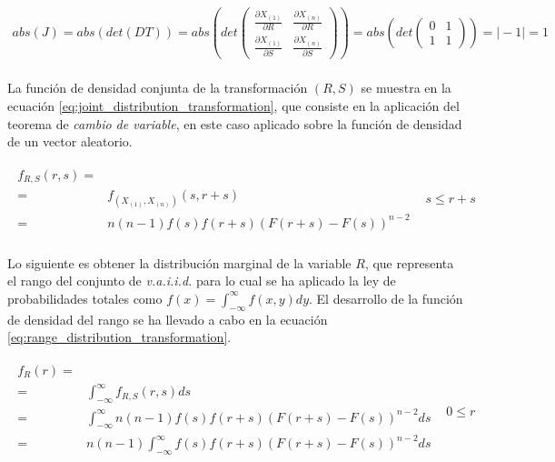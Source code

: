 \documentclass{article}
\begin{document}
    \begin{align}
    \label{eq:variable_transformation_jacobian}
      abs(J) =
      abs(det(DT)) =
      abs\left(det\left( \begin{array}{cc}
        \frac{\partial X_{(1)}}{ \partial R} & \frac{\partial X_{(n)}}{ \partial R}  \\
        \frac{\partial X_{(1)}}{ \partial S} & \frac{\partial X_{(n)}}{ \partial S}
      \end{array} \right) \right) =
      abs\left(det\left( \begin{array}{cc}
        0 & 1  \\
        1 & 1
      \end{array} \right) \right)  =
      \mid -1\mid =
      1
    \end{align}

    \paragraph{}
    La función de densidad conjunta de la transformación $(R,S)$ se muestra en la ecuación \eqref{eq:joint_distribution_transformation}, que consiste en la aplicación del teorema de \emph{cambio de variable}, en este caso aplicado sobre la función de densidad de un vector aleatorio.

    \begin{align}
    \label{eq:joint_distribution_transformation}
      \begin{split}
        f_{R,S}(r,s) =& \\
        =& f_{(X_{(1)}, X_{(n)})} (s,r+s) \\
        =& n(n-1)f(s)f(r+s)(F(r+s) - F(s))^{n-2}
      \end{split}& s \leq r + s
    \end{align}

    \paragraph{}
    Lo siguiente es obtener la distribución marginal de la variable $R$, que representa el rango del conjunto de \emph{v.a.i.i.d.} para lo cual se ha aplicado la ley de probabilidades totales como $f(x) = \int_{-\infty}^{\infty} f(x,y) dy$. El desarrollo de la función de densidad del rango se ha llevado a cabo en la ecuación \eqref{eq:range_distribution_transformation}.

    \begin{align}
    \label{eq:range_distribution_transformation}
      \begin{split}
        f_{R} (r) =& \\
        =& \int_{-\infty}^{\infty} f_{R,S}(r,s) ds \\
        =& \int_{-\infty}^{\infty} n(n-1)f(s)f(r+s)(F(r+s) - F(s))^{n-2} ds \\
        =& n(n-1)\int_{-\infty}^{\infty} f(s)f(r+s)(F(r+s) - F(s))^{n-2} ds \\
      \end{split}& 0 \leq r
    \end{align}
\end{document}
